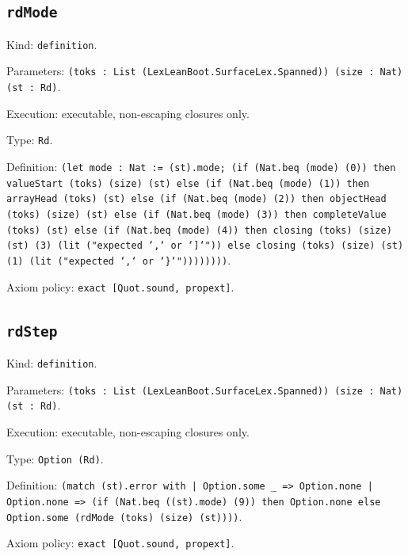 \documentclass[11pt]{article}
\begin{document}
\subsection*{\texttt{rdMode}}
\noindent Kind: \texttt{definition}.\par
\noindent Parameters: \texttt{(toks : List (LexLeanBoot.SurfaceLex.Spanned)) (size : Nat) (st : Rd)}.\par
\noindent Execution: executable, non-escaping closures only.\par
\noindent Type: \texttt{Rd}.\par
\noindent Definition: \texttt{(let mode : Nat := (st).mode; (if (Nat.beq (mode) (0)) then valueStart (toks) (size) (st) else (if (Nat.beq (mode) (1)) then arrayHead (toks) (st) else (if (Nat.beq (mode) (2)) then objectHead (toks) (size) (st) else (if (Nat.beq (mode) (3)) then completeValue (toks) (st) else (if (Nat.beq (mode) (4)) then closing (toks) (size) (st) (3) (lit ("expected `,` or `]`")) else closing (toks) (size) (st) (1) (lit ("expected `,` or `\}`"))))))))}.\par
\noindent Axiom policy: \texttt{exact [Quot.sound, propext]}.\par
\subsection*{\texttt{rdStep}}
\noindent Kind: \texttt{definition}.\par
\noindent Parameters: \texttt{(toks : List (LexLeanBoot.SurfaceLex.Spanned)) (size : Nat) (st : Rd)}.\par
\noindent Execution: executable, non-escaping closures only.\par
\noindent Type: \texttt{Option (Rd)}.\par
\noindent Definition: \texttt{(match (st).error with | Option.some \_ => Option.none | Option.none => (if (Nat.beq ((st).mode) (9)) then Option.none else Option.some (rdMode (toks) (size) (st))))}.\par
\noindent Axiom policy: \texttt{exact [Quot.sound, propext]}.\par
\end{document}
